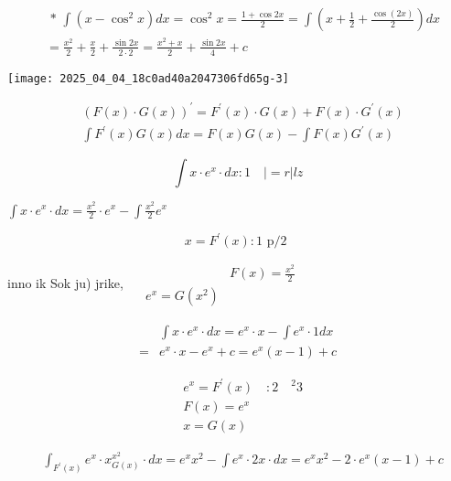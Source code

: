 \documentclass[10pt]{article}
\begin{document}
$$
\begin{aligned}
& \text { * } \int\left(x-\cos ^{2} x\right) d x=\cos ^{2} x=\frac{1+\cos 2 x}{2}=\int\left(x+\frac{1}{2}+\frac{\cos (2 x)}{2}\right) d x \\
& =\frac{x^{2}}{2}+\frac{x}{2}+\frac{\sin 2 x}{2 \cdot 2}=\frac{x^{2}+x}{2}+\frac{\sin 2 x}{4}+c
\end{aligned}
$$

\begin{center}
\texttt{[image: 2025\_04\_04\_18c0ad40a2047306fd65g-3]}
\end{center}

$$
\begin{aligned}
& (F(x) \cdot G(x))^{\prime}=F^{\prime}(x) \cdot G(x)+F(x) \cdot G^{\prime}(x) \\
& \int F^{\prime}(x) G(x) d x=F(x) G(x)-\int F(x) G^{\prime}(x)
\end{aligned}
$$

$$
\int x \cdot e^{x} \cdot d x: 1 \quad|=r| l z
$$

$\int x \cdot e^{x} \cdot d x=\frac{x^{2}}{2} \cdot e^{x}-\int \frac{x^{2}}{2} e^{x}$

$$
x=F^{\prime}(x): 1 \text { p/2 }
$$

inno ik Sok ju) jrike, $\quad \begin{array}{ll} & F(x)=\frac{x^{2}}{2} \\ e^{x}=G\left(x^{2}\right)\end{array}$

$$
\begin{aligned}
& \int x \cdot e^{x} \cdot d x=e^{x} \cdot x-\int e^{x} \cdot 1 d x \\
= & e^{x} \cdot x-e^{x}+c=e^{x}(x-1)+c
\end{aligned}
$$

$$
\begin{aligned}
& e^{x}=F^{\prime}(x) \quad: 2 \quad{ }^{2} 3 \\
& F(x)=e^{x} \\
& x=G(x)
\end{aligned}
$$

$$
\begin{aligned}
& \int_{F^{\prime}(x)} e^{x} \cdot x_{G(x)}^{x^{2}} \cdot d x=e^{x} x^{2}-\int e^{x} \cdot 2 x \cdot d x=e^{x} x^{2}-2 \cdot e^{x}(x-1)+c
\end{aligned}
$$
\end{document}
